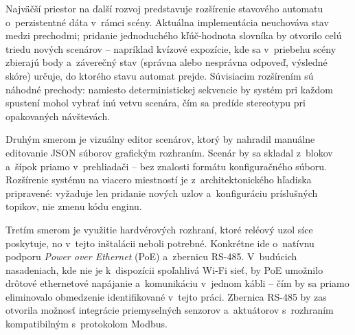 Najväčší priestor na ďalší rozvoj predstavuje rozšírenie stavového automatu
o~perzistentné dáta v~rámci scény. Aktuálna implementácia
neuchováva stav medzi prechodmi; pridanie jednoduchého kľúč-hodnota
slovníka by otvorilo celú triedu nových scenárov -- napríklad
kvízové expozície, kde sa v~priebehu scény zbierajú body
a~záverečný stav (správna alebo nesprávna odpoveď, výsledné
skóre) určuje, do ktorého stavu automat prejde. Súvisiacim
rozšírením sú náhodné prechody: namiesto deterministickej
sekvencie by systém pri každom spustení mohol vybrať inú vetvu
scenára, čím sa predíde stereotypu pri opakovaných návštevách.

Druhým smerom je vizuálny editor scenárov, ktorý by nahradil
manuálne editovanie JSON súborov grafickým rozhraním. Scenár
by sa skladal z~blokov a~šípok priamo v~prehliadači -- bez
znalosti formátu konfiguračného súboru. Rozšírenie systému
na viacero miestností je z~architektonického hľadiska
pripravené: vyžaduje len pridanie nových uzlov a~konfiguráciu
príslušných topikov, nie zmenu kódu enginu.

Tretím smerom je využitie hardvérových rozhraní, ktoré reléový
uzol síce poskytuje, no v~tejto inštalácii neboli potrebné.
Konkrétne ide o~natívnu podporu \textit{Power over Ethernet}
(PoE) a~zbernicu RS-485. V~budúcich nasadeniach, kde nie je
k~dispozícii spoľahlivá Wi-Fi sieť, by PoE umožnilo drôtové
ethernetové napájanie a~komunikáciu v~jednom kábli --
čím by sa priamo eliminovalo obmedzenie identifikované
v~tejto práci. Zbernica RS-485 by zas otvorila možnosť
integrácie priemyselných senzorov a~aktuátorov s~rozhraním
kompatibilným s~protokolom Modbus.
